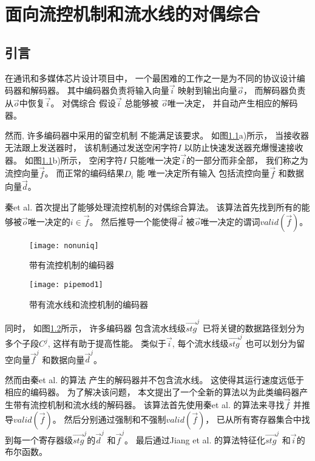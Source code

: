 \chapter{面向流控机制和流水线的对偶综合}
\label{chap:4}

\section{引言}\label{sec_intro}
在通讯和多媒体芯片设计项目中，
一个最困难的工作之一是为不同的协议设计编码器和解码器。
其中编码器负责将输入向量$\vec{i}$ 映射到输出向量$\vec{o}$，
而解码器负责从$\vec{o}$中恢复$\vec{i}$。
对偶综合\cite{ShenICCAD09,ShenTCAD11,ShenTCAD12,LiuICCAD11,LiuTCAD12,TuDAC13}
假设$\vec{i}$ 总能够被 $\vec{o}$唯一决定，
并自动产生相应的解码器。

然而,
许多编码器中采用的留空机制\cite{flowcontrol} 
不能满足该要求。
如图\ref{fig_fc}a)所示，
当接收器无法跟上发送器时，
该机制通过发送空闲字符$I$ 以防止快速发送器充爆慢速接收器。
如图\ref{fig_fc}b)所示，
空闲字符$I$
只能唯一决定$\vec{i}$的一部分而非全部，
我们称之为流控向量$\vec{f}$。
而正常的编码结果$D_i$ 能
唯一决定所有输入
包括流控向量$\vec{f}$ 和数据向量$\vec{d}$。

秦et al. \cite{QinTODAES15} 首次提出了能够处理流控机制的对偶综合算法。
该算法首先找到所有的能够被$\vec{o}$唯一决定的$i\in\vec{f}$。
然后推导一个能使得$\vec{d}$ 被$\vec{o}$唯一决定的谓词$valid(\vec{f})$。

\begin{figure}[t]
\centering
\texttt{[image: nonuniq]}
\caption{带有流控机制的编码器}
\label{fig_fc}
\end{figure}

\begin{figure}[b]
\centering
\texttt{[image: pipemod1]}
\caption{带有流水线和流控机制的编码器}
\label{pipemod}
\end{figure}



同时，
如图\ref{pipemod}所示，
许多编码器
包含流水线级$\vec{stg}^j$ 已将关键的数据路径划分为多个子段$C^j$,
这样有助于提高性能。
类似于$\vec{i}$,
每个流水线级$\vec{stg}^j$ 也可以划分为留空向量$\vec{f}^j$ 和数据向量$\vec{d}^j$。

然而由秦et al. 的算法\cite{QinTODAES15} 产生的解码器并不包含流水线。
这使得其运行速度远低于相应的编码器。
为了解决该问题，
本文提出了一个全新的算法以为此类编码器产生带有流控机制和流水线的解码器。
该算法首先使用秦et al. \cite{QinTODAES15}的算法来寻找$\vec{f}$ 并推导$valid(\vec{f})$。
然后分别通过强制和不强制$valid(\vec{f})$，
已从所有寄存器集合中找到每一个寄存器级$\vec{stg}^j$的$\vec{d}^j$ 和$\vec{f}^j$。
最后通过Jiang et al. \cite{InterpBoolFunction}的算法特征化$\vec{stg}^j$ 和$\vec{i}$的布尔函数。

